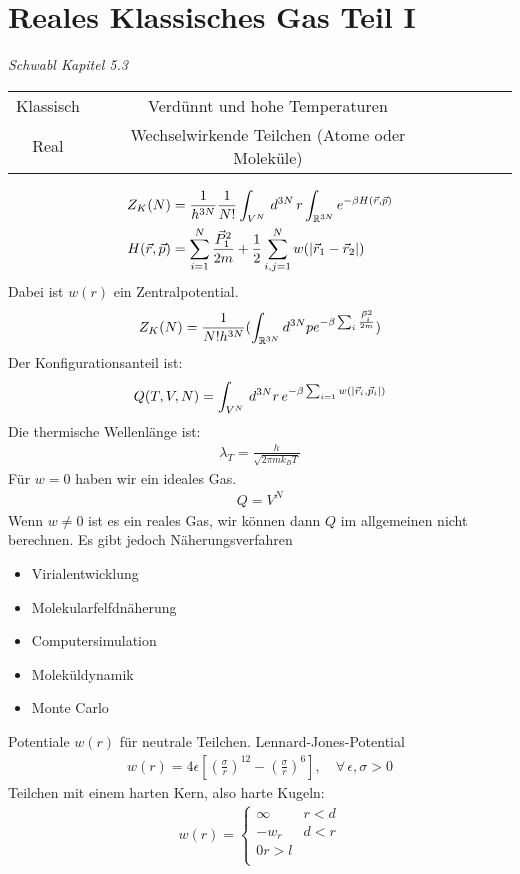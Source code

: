 \section*{Reales Klassisches Gas Teil I}
\emph{Schwabl Kapitel 5.3}
\begin{table}[h!]
  \centering
  \begin{tabular}{c c c c c c}
    Klassisch & Verd\"unnt und hohe Temperaturen \\
    Real & Wechselwirkende Teilchen (Atome oder Molek\"ule)
  \end{tabular}
\end{table}
%
\begin{align*}
  Z_K(N) & = \frac{1}{h^{3N}} 
  \frac{1}{N!} \int_{V^N}^{} \,d^{3N}\, r \int_{\mathbb{R}^{3N}}^{} e ^{-\beta H (\vec{r}, \vec{p})} \\
  H(\vec{r},\vec{p}) & = \sum_{i=1}^{N} 
  \frac{\vec{P}_1^2}{2m} + \frac{1}{2} \sum_{i,j=1}^{N} w (\left| \vec{r}_1 - \vec{r}_2 \right|)
\end{align*}
%
Dabei ist $w(r)$ ein Zentralpotential.
%
\begin{align*}
  Z_K(N) = \frac{1}{N! h^{3N}} ( \int_{\mathbb{R}^{3N}}^{} d^{3N}p e^{-\beta \sum_{i}^{} 
  \frac{\vec{P}_i^2}{2m}} 
)\end{align*}
%
Der Konfigurationsanteil ist:
%
\begin{align*}
  Q(T,V, N) = \int_{V^N}^{} \,d^{3N}r\, e^{-\beta \sum_{i=1}^{}w (\left| \vec{r}_i,\vec{p}_i \right|)}
\end{align*}
%
Die thermische Wellenl\"ange ist:
%
\begin{align*}
  \lambda_T = \frac{h}{\sqrt{2 \pi m k_B T}}
\end{align*}
%
F\"ur $w=0$ haben wir ein ideales Gas.
%
\begin{align*}
  Q = V^N
\end{align*}
%
Wenn $w \neq 0$ ist es ein reales Gas, wir k\"onnen dann $Q$ im allgemeinen
nicht berechnen. Es gibt jedoch N\"aherungsverfahren
\begin{itemize}
  \item Virialentwicklung
  \item Molekularfelfdn\"aherung
  \item Computersimulation
  \item Molek\"uldynamik
  \item Monte Carlo
\end{itemize}

Potentiale $w(r)$ f\"ur neutrale Teilchen.
Lennard-Jones-Potential
%
\begin{align*}
  w(r) = 4 \epsilon \left[ \left( \frac{\sigma}{r} \right)^{12} - \left( \frac{\sigma}{r} \right)^6 \right], \quad\forall\, \epsilon, \sigma > 0
\end{align*}
%
Teilchen mit einem harten Kern, also harte Kugeln:
%
\begin{align*}
  w(r) = \begin{cases}
    \infty & r < d \\
    - w_r & d < r \\
    0 r > l \\
  \end{cases} 
\end{align*}
%

